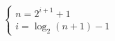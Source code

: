 \documentclass[preview]{standalone}
\begin{document}
\begin{align*}
\begin{cases} n = 2^{ i + 1} + 1 \\i = \log_2(n + 1) - 1\end{cases}
\end{align*}
\end{document}
